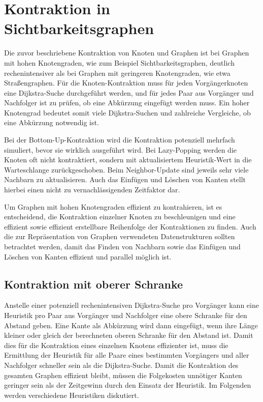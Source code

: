 \chapter{Kontraktion in Sichtbarkeitsgraphen}\label{chapter:kontraktion}

Die zuvor beschriebene Kontraktion von Knoten und Graphen ist bei Graphen mit hohen Knotengraden, wie zum Beispiel Sichtbarkeitsgraphen, deutlich rechenintensiver als bei Graphen mit geringeren Knotengraden, wie etwa Straßengraphen.
Für die Knoten-Kontraktion muss für jeden Vorgängerknoten eine Dijkstra-Suche durchgeführt werden, und für jedes Paar aus Vorgänger und Nachfolger ist zu prüfen, ob eine Abkürzung eingefügt werden muss.
Ein hoher Knotengrad bedeutet somit viele Dijkstra-Suchen und zahlreiche Vergleiche, ob eine Abkürzung notwendig ist.

Bei der Bottom-Up-Kontraktion wird die Kontraktion potenziell mehrfach simuliert, bevor sie wirklich ausgeführt wird.
Bei Lazy-Popping werden die Knoten oft nicht kontraktiert, sondern mit aktualisiertem Heuristik-Wert in die Warteschlange zurückgeschoben.
Beim Neighbor-Update sind jeweils sehr viele Nachbarn zu aktualisieren.
Auch das Einfügen und Löschen von Kanten stellt hierbei einen nicht zu vernachlässigenden Zeitfaktor dar.

Um Graphen mit hohen Knotengraden effizient zu kontrahieren, ist es entscheidend, die Kontraktion einzelner Knoten zu beschleunigen und eine effizient sowie effizient erstellbare Reihenfolge der Kontraktionen zu finden.
Auch die zur Repräsentation von Graphen verwendeten Datenstrukturen sollten betrachtet werden, damit das Finden von Nachbarn sowie das Einfügen und Löschen von Kanten effizient und parallel möglich ist.

\section{Kontraktion mit oberer Schranke}
Anstelle einer potenziell rechenintensiven Dijkstra-Suche pro Vorgänger kann eine Heuristik pro Paar aus Vorgänger und Nachfolger eine obere Schranke für den Abstand geben.
Eine Kante als Abkürzung wird dann eingefügt, wenn ihre Länge kleiner oder gleich der berechneten oberen Schranke für den Abstand ist.
Damit dies für die Kontraktion eines einzelnen Knotens effizienter ist, muss die Ermittlung der Heuristik für alle Paare eines bestimmten Vorgängers und aller Nachfolger schneller sein als die Dijkstra-Suche.
Damit die Kontraktion des gesamten Graphen effizient bleibt, müssen die Folgekosten unnötiger Kanten geringer sein als der Zeitgewinn durch den Einsatz der Heuristik.
Im Folgenden werden verschiedene Heuristiken diskutiert.

